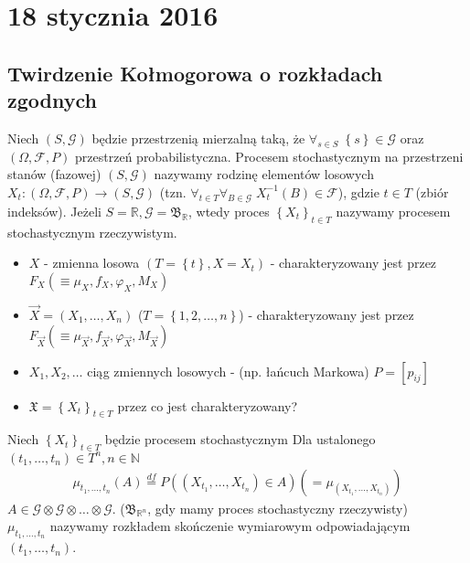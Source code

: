 \chapter{18 stycznia 2016}
\section{Twirdzenie Kołmogorowa o rozkładach zgodnych}
\begin{defi}
Niech $ (S,\mathcal G) $ będzie przestrzenią mierzalną taką, że $ \forall_{s\in S}\;\left\{s\right\}\in \mathcal G $ oraz $ \left(\Omega,\mathcal F,P\right) $ przestrzeń probabilistyczna. Procesem stochastycznym na przestrzeni stanów (fazowej) $ \left(S,\mathcal G\right) $ nazywamy rodzinę elementów losowych $ X_t:\left(\Omega,\mathcal F,P\right) \to \left(S,\mathcal G\right)$ (tzn. $ \forall_{t\in T}\forall_{B\in \mathcal G}\;X_t^{-1}(B)\in \mathcal F $), gdzie $ t\in T $ (zbiór indeksów). Jeżeli $ S=\mathbb R ,\mathcal G=\mathfrak B_\mathbb R  $, wtedy proces $ \left\{X_t\right\} _{t\in T}$ nazywamy procesem stochastycznym rzeczywistym.
\end{defi}
\begin{itemize}
\item $ X $ - zmienna losowa $ \left(T=\left\{t\right\},X=X_t\right) $ - charakteryzowany jest przez $ F_X(\equiv\mu_X,f_X,\varphi_X,M_X) $
\item $ \vec X=\left(X_1,\dots,X_n\right) $ ($ T=\left\{1,2,\dots,n\right\} $) - charakteryzowany jest przez $ F_{\vec X} (\equiv\mu_{\vec X},f_{\vec X},\varphi_{\vec X},M_{\vec X}) $
\item $ X_1,X_2,\dots $ ciąg zmiennych losowych - (np. łańcuch Markowa) $ P=\left[p_{ij}\right]$
\item $ \mathfrak X=\left\{X_t\right\} _{t\in T}$ przez co jest charakteryzowany?
\end{itemize}
\begin{defi}
Niech $ \left\{X_t\right\} _{t\in T}$ będzie procesem stochastycznym Dla ustalonego $ (t_1,\dots,t_n)\in T^n, n\in \mathbb N $
\begin{gather*}
\mu_{t_1,\dots,t_n}(A)\stackrel{df}{=}P\left(\left(X_{t_1},\dots,X_{t_n}\right)\in A\right)(=\mu_{(X_{t_1},\dots,X_{t_n})})
\end{gather*}
$ A\in\mathcal G\otimes\mathcal G\otimes\dots\otimes\mathcal G $. ($ \mathfrak B_{\mathbb R ^n} $, gdy mamy proces stochastyczny rzeczywisty)\\
$ \mu_{t_1,\dots,t_n} $ nazywamy rozkładem skończenie wymiarowym odpowiadającym $ \left(t_1,\dots,t_n\right) $.
\end{defi}

